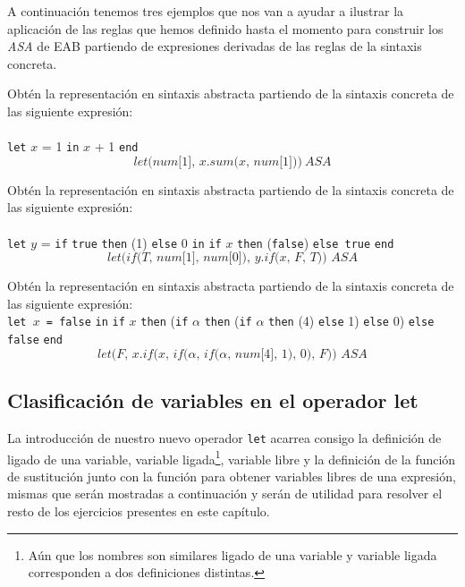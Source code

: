     A continuación tenemos tres ejemplos que nos van a ayudar a ilustrar la aplicación de las reglas que hemos definido hasta el momento para construir los \textit{ASA} de \textsf{EAB} partiendo de expresiones derivadas de las reglas de la sintaxis concreta.

    \begin{exercise}
        Obtén la representación en sintaxis abstracta partiendo de la sintaxis concreta de las siguiente expresión: \\\\
        \texttt{let} $x$ = 1 \texttt{in} $x$ + 1 \texttt{end}\\
        \[
            \textit{let(num[1], $x$.sum($x$, num[1]))}\ ASA
        \]
    \end{exercise}

    \begin{exercise}
        Obtén la representación en sintaxis abstracta partiendo de la sintaxis concreta de las siguiente expresión: \\\\
        \texttt{let} $y$ = \texttt{if} \texttt{true} \texttt{then} (1) \texttt{else} 0 \texttt{in} \texttt{if} $x$ \texttt{then} (\texttt{false}) \texttt{else true} \texttt{end}\\
        \[
            \textit{let(if(T, num[1], num[0]), $y$.if($x$, F, T))\ ASA}
        \]
    \end{exercise}

    \begin{exercise}
        Obtén la representación en sintaxis abstracta partiendo de la sintaxis concreta de las siguiente expresión: \\
        
        \texttt{let $x$ = false} \texttt{in} \texttt{if} $x$ \texttt{then} (\texttt{if} $\alpha$ \texttt{then} (\texttt{if} $\alpha$ \texttt{then} (4) \texttt{else} 1) \texttt{else} 0) \texttt{else false} \texttt{end}\\
        \[
            \textit{let(F, x.if(x, if($\alpha$, if($\alpha$, num[4], 1), 0), F)) ASA}
        \]        
    \end{exercise}

  

    \subsection{Clasificación de variables en el operador let}
    
    La introducción de nuestro nuevo operador \texttt{let} acarrea consigo la definición de ligado de una variable, variable ligada\footnote{Aún que los nombres son similares ligado de una variable y variable ligada corresponden a dos definiciones distintas.}, variable libre y la definición de la función de sustitución junto con la función para obtener variables libres de una expresión, mismas que serán mostradas a continuación y serán de utilidad para resolver el resto de los ejercicios presentes en este capítulo.\\
    
